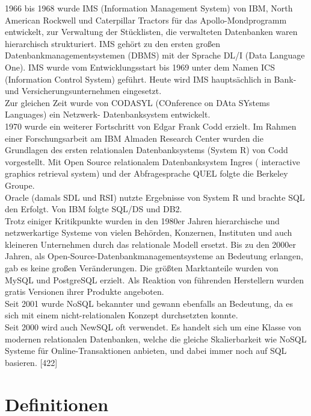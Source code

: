 \documentclass[12pt,a4paper]{report}
\begin{document}
\begin{onehalfspace}
1966 bis 1968 wurde IMS (Information Management System) von IBM, North American Rockwell und Caterpillar Tractors für das Apollo-Mondprogramm entwickelt, zur Verwaltung der Stücklisten, die verwalteten Datenbanken waren hierarchisch strukturiert. IMS gehört zu den ersten großen Datenbankmanagementsystemen (DBMS) mit der Sprache DL/I (Data Language One). IMS wurde vom Entwicklungsstart bis 1969 unter dem Namen  ICS (Information Control System) geführt. Heute wird IMS hauptsächlich in Bank- und Versicherungsunternehmen eingesetzt.\\

Zur gleichen Zeit wurde von CODASYL (COnference on DAta SYstems Languages) ein Netzwerk- Datenbanksystem entwickelt.\\

1970 wurde ein weiterer Fortschritt von Edgar Frank Codd erzielt. Im Rahmen einer Forschungsarbeit am IBM Almaden Research Center wurden die Grundlagen des ersten relationalen Datenbanksystems (System R) von Codd vorgestellt. Mit Open Source relationalem Datenbanksystem Ingres ( interactive graphics retrieval system) und der Abfragesprache QUEL folgte die Berkeley Groupe.\\

Oracle (damals SDL und RSI) nutzte Ergebnisse von System R und brachte SQL den Erfolgt.  Von IBM folgte SQL/DS und DB2.\\

Trotz einiger Kritikpunkte wurden in den 1980er Jahren hierarchische und netzwerkartige Systeme von vielen Behörden, Konzernen, Instituten und auch kleineren Unternehmen durch das relationale Modell ersetzt. Bis zu den 2000er Jahren, als Open-Source-Datenbankmanagementsysteme an Bedeutung erlangen, gab es keine großen Veränderungen. Die größten Marktanteile wurden von MySQL und PostgreSQL erzielt.
Als Reaktion von führenden Herstellern wurden gratis Versionen ihrer Produkte angeboten.\\

Seit 2001 wurde  NoSQL bekannter und gewann ebenfalls an Bedeutung, da es sich mit einem nicht-relationalen Konzept durchsetzten konnte. \\

Seit 2000 wird auch NewSQL oft verwendet. Es handelt sich um eine Klasse von modernen relationalen Datenbanken, welche die gleiche Skalierbarkeit wie NoSQL Systeme für Online-Transaktionen anbieten, und dabei immer noch auf SQL basieren. [422]

\section{Definitionen}

\end{onehalfspace}
\end{document}
